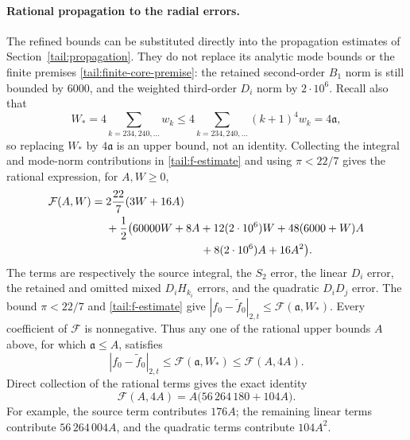\paragraph{Rational propagation to the radial errors.}
The refined bounds can be substituted directly into the propagation
estimates of Section~\ref{tail:propagation}.  They do not replace its
analytic mode bounds or the finite premises
\eqref{tail:finite-core-premise}: the retained second-order $B_1$ norm
is still bounded by $6000$, and the weighted third-order $D_i$ norm by
$2\cdot10^6$.  Recall also that
\begin{equation}
 W_*=4\sum_{k=234,240,\ldots}w_k
 \leq4\sum_{k=234,240,\ldots}(k+1)^4w_k=4\mathfrak a,
 \label{supp:W-bound}
\end{equation}
so replacing $W_*$ by $4\mathfrak a$ is an upper bound, not an identity.
Collecting the integral and mode-norm contributions in
\eqref{tail:f-estimate} and using $\pi<22/7$ gives the rational
expression, for $A,W\geq0$,
\begin{align}
 \mathcal F(A,W)={}&2\frac{22}{7}(3W+16A)\notag\\
 &+\frac12\bigl(60000W+8A+12(2\cdot10^6)W
       +48(6000+W)A\notag\\
 &\hspace{30mm}+8(2\cdot10^6)A+16A^2\bigr).
 \label{supp:rational-error-expression}
\end{align}
The terms are respectively the source integral, the $S_2$ error, the
linear $D_i$ error, the retained and omitted mixed $D_iH_{k_i}$ errors,
and the quadratic $D_iD_j$ error.  The bound $\pi<22/7$ and
\eqref{tail:f-estimate} give
$|f_0-\widetilde f_0|_{2,t}\leq\mathcal F(\mathfrak a,W_*)$.
Every coefficient of $\mathcal F$ is nonnegative.  Thus any one of the
rational upper bounds $A$ above, for which $\mathfrak a\leq A$, satisfies
\[
 |f_0-\widetilde f_0|_{2,t}
 \leq\mathcal F(\mathfrak a,W_*)\leq\mathcal F(A,4A).
\]
Direct collection of the rational terms gives the exact identity
\begin{equation}
 \mathcal F(A,4A)=A\bigl(56\,264\,180+104A\bigr).
 \label{supp:rational-error-coefficient}
\end{equation}
For example, the source term contributes $176A$; the remaining linear
terms contribute $56\,264\,004A$, and the quadratic terms contribute
$104A^2$.


